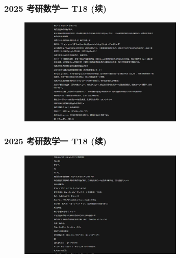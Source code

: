 \begin{frame}
    \frametitle{2025 考研数学一 T18 (续)}
    \begin{figure}
        \centering
        \includegraphics[width=0.7\textwidth]{./pic/13.png} %
        \label{fig:kaoyan_solution_5}
    \end{figure}
\end{frame}

\begin{frame}
    \frametitle{2025 考研数学一 T18 (续)}
    \begin{figure}
        \centering
        \includegraphics[width=0.7\textwidth]{./pic/14.png} %
        \label{fig:kaoyan_solution_6}
    \end{figure}
\end{frame}

